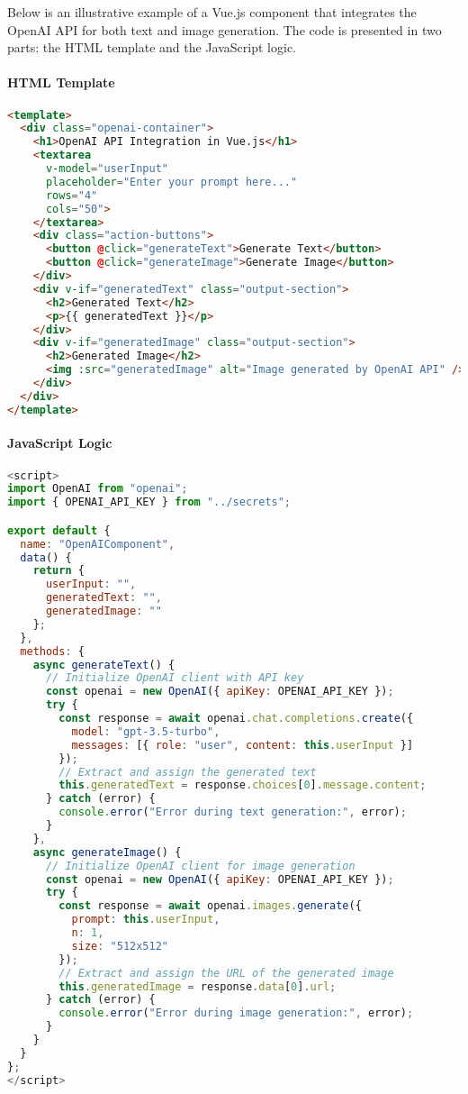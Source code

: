 Below is an illustrative example of a Vue.js component that integrates the OpenAI API for both text and image generation. The code is presented in two parts: the HTML template and the JavaScript logic.

\paragraph{HTML Template}
\begin{lstlisting}[language=HTML, caption=Vue.js Template for OpenAI API Integration]
<template>
  <div class="openai-container">
    <h1>OpenAI API Integration in Vue.js</h1>
    <textarea 
      v-model="userInput" 
      placeholder="Enter your prompt here..." 
      rows="4" 
      cols="50">
    </textarea>
    <div class="action-buttons">
      <button @click="generateText">Generate Text</button>
      <button @click="generateImage">Generate Image</button>
    </div>
    <div v-if="generatedText" class="output-section">
      <h2>Generated Text</h2>
      <p>{{ generatedText }}</p>
    </div>
    <div v-if="generatedImage" class="output-section">
      <h2>Generated Image</h2>
      <img :src="generatedImage" alt="Image generated by OpenAI API" />
    </div>
  </div>
</template>
\end{lstlisting}

\paragraph{JavaScript Logic}
\begin{lstlisting}[language=JavaScript, caption=Vue.js Script for OpenAI API Integration]
<script>
import OpenAI from "openai";
import { OPENAI_API_KEY } from "../secrets";

export default {
  name: "OpenAIComponent",
  data() {
    return {
      userInput: "",
      generatedText: "",
      generatedImage: ""
    };
  },
  methods: {
    async generateText() {
      // Initialize OpenAI client with API key
      const openai = new OpenAI({ apiKey: OPENAI_API_KEY });
      try {
        const response = await openai.chat.completions.create({
          model: "gpt-3.5-turbo",
          messages: [{ role: "user", content: this.userInput }]
        });
        // Extract and assign the generated text
        this.generatedText = response.choices[0].message.content;
      } catch (error) {
        console.error("Error during text generation:", error);
      }
    },
    async generateImage() {
      // Initialize OpenAI client for image generation
      const openai = new OpenAI({ apiKey: OPENAI_API_KEY });
      try {
        const response = await openai.images.generate({
          prompt: this.userInput,
          n: 1,
          size: "512x512"
        });
        // Extract and assign the URL of the generated image
        this.generatedImage = response.data[0].url;
      } catch (error) {
        console.error("Error during image generation:", error);
      }
    }
  }
};
</script>
\end{lstlisting}

